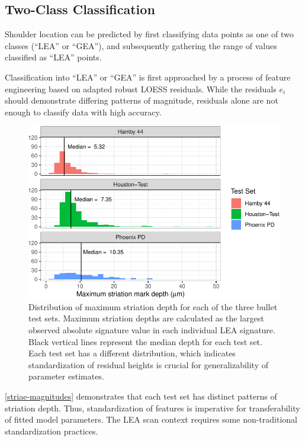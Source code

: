 \documentclass[12pt]{article}
\begin{document}
\subsection{Two-Class Classification}

Shoulder location can be predicted by first classifying data points as
one of two classes (``LEA'' or ``GEA''), and subsequently gathering the
range of values classified as ``LEA'' points.

Classification into ``LEA'' or ``GEA'' is first approached by a process
of feature engineering based on adapted robust LOESS residuals. While
the residuals \(e_i\) should demonstrate differing patterns of
magnitude, residuals alone are not enough to classify data with high
accuracy.

\begin{figure}
\centering
\includegraphics{writeup_files/figure-latex/striae-magnitudes-1.pdf}
\caption{\label{striae-magnitudes}Distribution of maximum striation
depth for each of the three bullet test sets. Maximum striation depths
are calculated as the largest observed absolute signature value in each
individual LEA signature. Black vertical lines represent the median
depth for each test set. Each test set has a different distribution,
which indicates standardization of residual heights is crucial for
generalizability of parameter estimates.}
\end{figure}

\autoref{striae-magnitudes} demonstrates that each test set has distinct
patterns of striation depth. Thus, standardization of features is
imperative for transferability of fitted model parameters. The LEA scan
context requires some non-traditional standardization practices.
\end{document}
